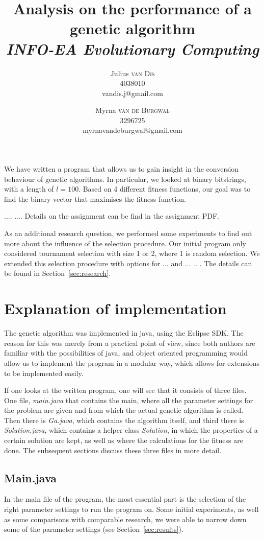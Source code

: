 \documentclass[10pt,a4paper,onecolumn]{article}
\title{Analysis on the performance of a genetic algorithm\\ \textit{INFO-EA Evolutionary Computing}}
\author{Julius \textsc{van Dis} \\ 4038010 \\vandis.j@gmail.com
\and Myrna \textsc{van de Burgwal} \\ 3296725 \\myrnavandeburgwal@gmail.com}
\begin{document}
\maketitle
\thispagestyle{empty}
%
\section*{}
We have written a program that allows us to gain insight in the conversion behaviour of genetic algorithms. In particular, we looked at binary bitstrings, with a length of $l=100$. Based on 4 different fitness functions, our goal was to find the binary vector that maximises the fitness function.

....
....
Details on the assignment can be find in the assignment PDF.

As an additional research question, we performed some experiments to find out more about the influence of the selection procedure. Our initial program only considered tournament selection with size 1 or 2, where 1 is random selection. We extended this selection procedure with options for ... and  ... .. . The details can be found in Section~\ref{sec:research}.

\section{Explanation of implementation}
The genetic algorithm was implemented in java, using the Eclipse SDK. The reason for this was merely from a practical point of view, since both authors are familiar with the possibilities of java, and object oriented programming would allow us to implement the program in a modular way, which allows for extensions to be implemented easily.

If one looks at the written program, one will see that it consists of three files. One file, \textit{main.java} that contains the main, where all the parameter settings for the problem are given and from which the actual genetic algorithm is called. Then there is \textit{Ga.java}, which contains the algorithm itself, and third there is \textit{Solution.java}, which contains a helper class \textit{Solution}, in which the properties of a certain solution are kept, as well as where the calculations for the fitness are done. The subsequent sections discuss these three files in more detail.

\subsection{Main.java}
In the main file of the program, the most essential part is the selection of the right parameter settings to run the program on. Some initial experiments, as well as some comparisons with comparable research, we were able to narrow down some of the parameter settings (see Section~\ref{sec:results}). 
\end{document}
